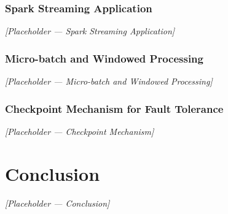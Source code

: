 \documentclass[a4paper,12pt]{extarticle}
\begin{document}
\subsubsection{Spark Streaming Application}


\textit{[Placeholder — Spark Streaming Application]}

\subsubsection{Micro-batch and Windowed Processing}


\textit{[Placeholder — Micro-batch and Windowed Processing]}

\subsubsection{Checkpoint Mechanism for Fault Tolerance}


\textit{[Placeholder — Checkpoint Mechanism]}

\section{Conclusion}


\textit{[Placeholder — Conclusion]}
\end{document}
